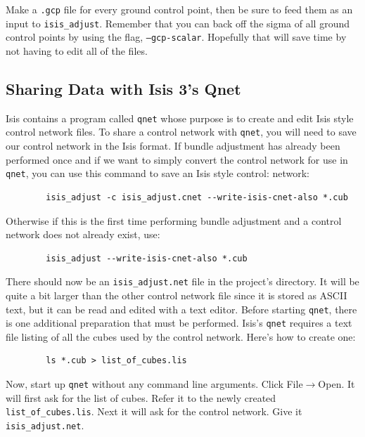 Make a {\tt .gcp} file for every ground control point, then be sure to
feed them as an input to {\tt isis\_adjust}. Remember that you can
back off the sigma of all ground control points by using the flag,
{\tt --gcp-scalar}. Hopefully that will save time by not having to
edit all of the files.

\subsection{Sharing Data with Isis 3's Qnet}

Isis contains a program called \texttt{qnet} whose purpose is to
create and edit Isis style control network files. To share a control
network with \texttt{qnet}, you will need to save our control network
in the Isis format. If bundle adjustment has already been performed
once and if we want to simply convert the control network for use in
\texttt{qnet}, you can use this command to save an Isis style control:
network:

\begin{verbatim}
        isis_adjust -c isis_adjust.cnet --write-isis-cnet-also *.cub
\end{verbatim}

Otherwise if this is the first time performing bundle adjustment and a
control network does not already exist, use:

\begin{verbatim}
        isis_adjust --write-isis-cnet-also *.cub
\end{verbatim}

There should now be an \verb=isis_adjust.net= file in the project's
directory. It will be quite a bit larger than the other control
network file since it is stored as ASCII text, but it can be read and
edited with a text editor. Before starting \texttt{qnet}, there is one
additional preparation that must be performed. Isis's \texttt{qnet} requires
a text file listing of all the cubes used by the control
network. Here's how to create one:

\begin{verbatim}
        ls *.cub > list_of_cubes.lis
\end{verbatim}

Now, start up \texttt{qnet} without any command line arguments. Click
File$\rightarrow$Open. It will first ask for the list of cubes. Refer
it to the newly created \texttt{list\_of\_cubes.lis}. Next it will ask for
the control network. Give it \texttt{isis\_adjust.net}.

